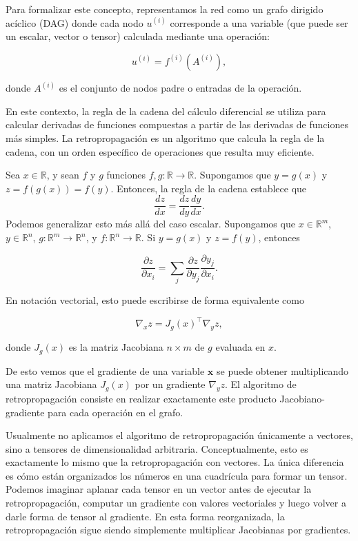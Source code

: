 Para formalizar este concepto, representamos la red como un grafo dirigido acíclico (DAG) donde cada nodo $u^{(i)}$ corresponde a una variable (que puede ser un escalar, vector o tensor) calculada mediante una operación:

\[
u^{(i)} = f^{(i)}(A^{(i)}),
\]

donde $A^{(i)}$ es el conjunto de nodos padre o entradas de la operación. 

En este contexto, la regla de la cadena del cálculo diferencial se utiliza para calcular derivadas de funciones compuestas a partir de las derivadas de funciones más simples. La retropropagación es un algoritmo que calcula la regla de la cadena, con un orden específico de operaciones que resulta muy eficiente.

Sea $x \in \mathbb{R}$, y sean $f$ y $g$ funciones $f,g: \mathbb{R} \to \mathbb{R}$. Supongamos que $y = g(x)$ y $z = f(g(x)) = f(y)$. Entonces, la regla de la cadena establece que
\[
\frac{dz}{dx} = \frac{dz}{dy} \frac{dy}{dx}.
\]
Podemos generalizar esto más allá del caso escalar. Supongamos que $x \in \mathbb{R}^m$, $y \in \mathbb{R}^n$, $g:\mathbb{R}^m \to \mathbb{R}^n$, y $f:\mathbb{R}^n \to \mathbb{R}$. Si $y = g(x)$ y $z = f(y)$, entonces

\[
\frac{\partial z}{\partial x_i} = \sum_j \frac{\partial z}{\partial y_j} \frac{\partial y_j}{\partial x_i}. \tag{6.45}
\]

En notación vectorial, esto puede escribirse de forma equivalente como

\[
\nabla_x z = J_g(x)^\top \nabla_y z,
\]

donde $J_g(x)$ es la matriz Jacobiana $n \times m$ de $g$ evaluada en $x$.

\vspace{0.3cm}

De esto vemos que el gradiente de una variable $\mathbf{x}$ se puede obtener multiplicando una matriz Jacobiana $J_g(x)$ por un gradiente $\nabla_y z$. El algoritmo de retropropagación consiste en realizar exactamente este producto Jacobiano-gradiente para cada operación en el grafo.

\vspace{0.3cm}

Usualmente no aplicamos el algoritmo de retropropagación únicamente a vectores, sino a tensores de dimensionalidad arbitraria. Conceptualmente, esto es exactamente lo mismo que la retropropagación con vectores. La única diferencia es cómo están organizados los números en una cuadrícula para formar un tensor. Podemos imaginar aplanar cada tensor en un vector antes de ejecutar la retropropagación, computar un gradiente con valores vectoriales y luego volver a darle forma de tensor al gradiente. En esta forma reorganizada, la retropropagación sigue siendo simplemente multiplicar Jacobianas por gradientes.

